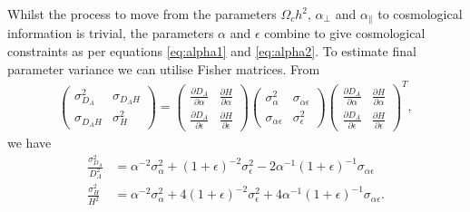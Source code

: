 \documentclass[titlesmallcaps, examinerscopy, copyrightpage]{uqthesis}
\begin{document}
Whilst the process to move from the parameters $\Omega_c h^2$, $\alpha_\perp$ and $\alpha_\parallel$ to cosmological information is trivial, the parameters $\alpha$ and $\epsilon$ combine to give cosmological constraints as per equations \eqref{eq:alpha1} and \eqref{eq:alpha2}. To estimate final parameter variance we can utilise Fisher matrices. From
\begin{align}
\begin{pmatrix}
\sigma_{D_A}^2 & \sigma_{D_A H} \\ \sigma_{D_A H} & \sigma_H^2 \end{pmatrix}
 = 
\begin{pmatrix}
\frac{\partial D_A}{\partial \alpha} & \frac{\partial H}{\partial \alpha} \\ \frac{\partial D_A}{\partial \epsilon} & \frac{\partial H}{\partial \epsilon} \end{pmatrix} 
\begin{pmatrix}
\sigma_\alpha^2 & \sigma_{\alpha \epsilon} \\ \sigma_{\alpha \epsilon} & \sigma_\epsilon^2
\end{pmatrix}
\begin{pmatrix}
\frac{\partial D_A}{\partial \alpha} & \frac{\partial H}{\partial \alpha} \\ \frac{\partial D_A}{\partial \epsilon} & \frac{\partial H}{\partial \epsilon} \end{pmatrix} ^T,
\end{align}
we have
\begin{align}
\frac{\sigma_{D_A}^2}{D_A^2} &= \alpha^{-2} \sigma_\alpha^2 + \left(1 + \epsilon \right)^{-2} \sigma_\epsilon^2 - 2\alpha^{-1}\left(1 + \epsilon \right)^{-1} \sigma_{\alpha \epsilon} \\
\frac{\sigma_H^2}{H^2} &= \alpha^{-2} \sigma_\alpha^2 + 4(1+\epsilon)^{-2} \sigma_\epsilon^2 + 4 \alpha^{-1} (1 + \epsilon)^{-1} \sigma_{\alpha \epsilon}.
\end{align}
\end{document}
